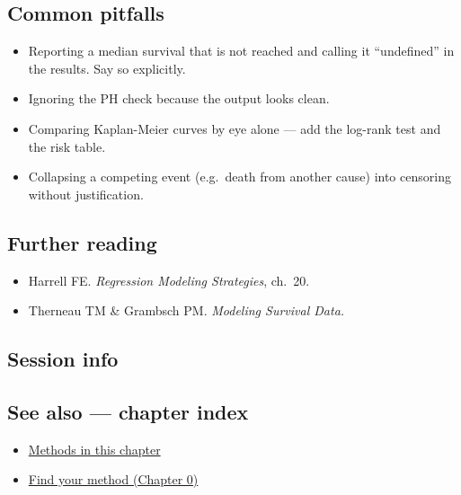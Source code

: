 \documentclass[
]{article}
\newenvironment{Shaded}{\begin{snugshade}}{\end{snugshade}}
\providecommand{\tightlist}{%
  \setlength{\itemsep}{0pt}\setlength{\parskip}{0pt}}
\begin{document}
\subsection{Common pitfalls}\label{common-pitfalls}

\begin{itemize}
\tightlist
\item
  Reporting a median survival that is not reached and calling it
  ``undefined'' in the results. Say so explicitly.
\item
  Ignoring the PH check because the output looks clean.
\item
  Comparing Kaplan-Meier curves by eye alone --- add the log-rank test
  and the risk table.
\item
  Collapsing a competing event (e.g.~death from another cause) into
  censoring without justification.
\end{itemize}

\subsection{Further reading}\label{further-reading}

\begin{itemize}
\tightlist
\item
  Harrell FE. \emph{Regression Modeling Strategies}, ch.~20.
\item
  Therneau TM \& Grambsch PM. \emph{Modeling Survival Data.}
\end{itemize}

\subsection{Session info}\label{session-info}

\begin{Shaded}
\begin{Highlighting}[]

\end{Highlighting}
\end{Shaded}

\subsection{See also --- chapter index}\label{see-also-chapter-index}

\begin{itemize}
\tightlist
\item
  \href{../index.Rmd}{Methods in this chapter}
\item
  \href{../../../ch00-find-your-method.Rmd}{Find your method (Chapter
  0)}
\end{itemize}
\end{document}
